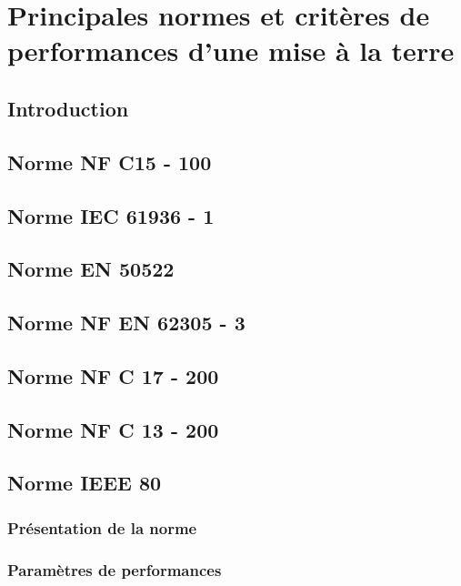 \chapter{Principales normes et critères de performances d'une mise à la terre}

	\section{Introduction}
	\section{Norme NF C15 - 100}
	\section{Norme IEC 61936 - 1}
	\section{Norme EN 50522}
	\section{Norme NF EN 62305 - 3}
	\section{Norme NF C 17 - 200}
	\section{Norme NF C 13 - 200}
	\section{Norme IEEE 80}
		\subsection{Présentation de la norme}
		\subsection{Paramètres de performances}
